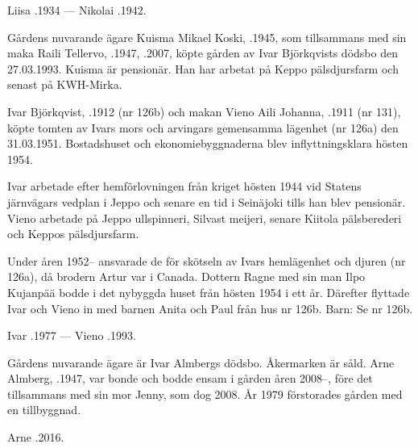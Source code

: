 Liisa .1934  ---  Nikolai .1942.






Gårdens nuvarande ägare Kuisma Mikael Koski, .1945, som tillsammans med sin maka Raili Tellervo, .1947, .2007, köpte gården av Ivar Björkqvists dödsbo den 27.03.1993. Kuisma är pensionär. Han har arbetat på Keppo pälsdjursfarm och senast på KWH-Mirka.


Ivar Björkqvist, .1912 (nr 126b) och makan Vieno Aili Johanna, .1911 (nr 131), köpte tomten av Ivars mors och arvingars gemensamma lägenhet (nr 126a) den 31.03.1951. Bostadshuset och ekonomiebyggnaderna blev inflyttningsklara hösten 1954.

Ivar arbetade efter hemförlovningen från kriget hösten  1944 vid Statens järnvägars vedplan i Jeppo och senare en tid i Seinäjoki tills han blev pensionär. Vieno arbetade på Jeppo ullspinneri, Silvast meijeri, senare Kiitola pälsberederi och Keppos pälsdjursfarm.

Under åren 1952-- ansvarade de för skötseln av Ivars hemlägenhet och djuren (nr 126a), då brodern Artur var i Canada. Dottern Ragne med sin man Ilpo Kujanpää bodde i det nybyggda huset från hösten 1954 i ett år. Därefter flyttade Ivar och Vieno in med barnen Anita och Paul från hus nr 126b. Barn: Se nr 126b.

Ivar .1977  ---  Vieno .1993.






Gårdens nuvarande ägare är Ivar Almbergs dödsbo. Åkermarken är såld. Arne Almberg, .1947, var bonde och bodde ensam i gården åren 2008--, före det tillsammans med sin mor Jenny, som dog 2008. År 1979 förstorades gården med en tillbyggnad.

Arne .2016.


